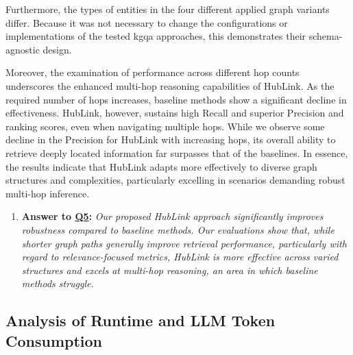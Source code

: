 Furthermore, the types of entities in the four different applied graph variants differ. Because it was not necessary to change the configurations or implementations of the tested \gls{kgqa} approaches, this demonstrates their schema-agnostic design.

Moreover, the examination of performance across different hop counts underscores the enhanced multi-hop reasoning capabilities of HubLink. As the required number of hops increases, baseline methods show a significant decline in effectiveness. HubLink, however, sustains high Recall and superior Precision and ranking scores, even when navigating multiple hops. While we observe some decline in the Precision for HubLink with increasing hops, its overall ability to retrieve deeply located information far surpasses that of the baselines. In essence, the results indicate that HubLink adapts more effectively to diverse graph structures and complexities, particularly excelling in scenarios demanding robust multi-hop inference.


\begin{enumerate}[label={}]
    \item \textbf{Answer to \hyperref[sec:evaluation_gqm_plan]{Q5}:} \textit{Our proposed HubLink approach significantly improves robustness compared to baseline methods. Our evaluations show that, while shorter graph paths generally improve retrieval performance, particularly with regard to relevance-focused metrics, HubLink is more effective across varied structures and excels at multi-hop reasoning, an area in which baseline methods struggle.}
\end{enumerate}

\subsection{Analysis of Runtime and LLM Token Consumption}
\label{sec:evaluation_runtime_and_tokens}

